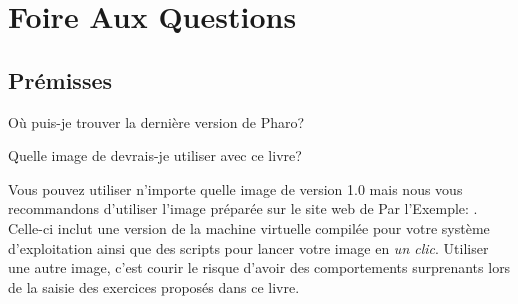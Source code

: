 \documentclass[a4paper,10pt,twoside]{book}
\begin{document}
	\renewcommand{\nnbb}[2]{} %
	\sloppy
\fi
  
\chapter{Foire Aux Questions}
\label{cha:faq}


\section{Prémisses}
\begin{faq}
Où puis-je trouver la dernière version de Pharo?
\end{faq}
\answer
\pharoweb
{}

\begin{faq}
Quelle image de \pharo devrais-je utiliser avec ce livre?
\end{faq}
\answer
Vous pouvez utiliser n'importe quelle image \pharo 
de version 1.0
mais nous vous recommandons d'utiliser l'image préparée sur le site web de \pharo 
Par l'Exemple: {\ppe}.
Celle-ci inclut une version de la machine virtuelle compilée pour votre système d'exploitation
ainsi que des scripts pour lancer votre image en \emph{un clic}.
Utiliser une autre image, c'est courir le risque d'avoir des comportements surprenants lors
de la saisie des exercices proposés dans ce livre.
\end{document}
